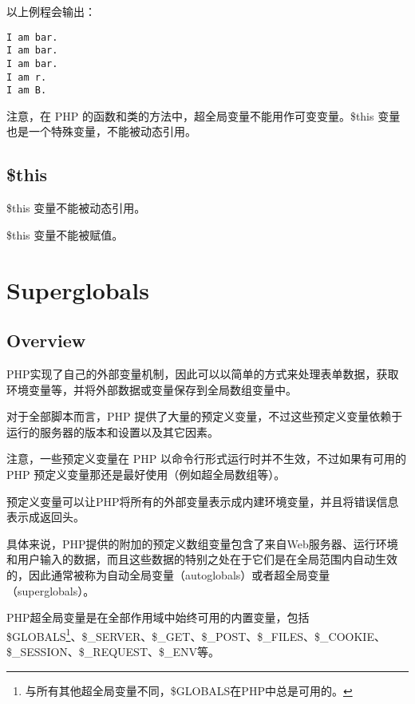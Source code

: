 以上例程会输出：

\begin{verbatim}
I am bar.
I am bar.
I am bar.
I am r.
I am B.
\end{verbatim}

注意，在 PHP 的函数和类的方法中，超全局变量不能用作可变变量。\$this 变量也是一个特殊变量，不能被动态引用。

\section{\$this}

\begin{compactitem}
\item \$this 变量不能被动态引用。
\item \$this 变量不能被赋值。
\end{compactitem}



\chapter{Superglobals}


\section{Overview}


PHP实现了自己的外部变量机制，因此可以以简单的方式来处理表单数据，获取环境变量等，并将外部数据或变量保存到全局数组变量中。




对于全部脚本而言，PHP 提供了大量的预定义变量，不过这些预定义变量依赖于运行的服务器的版本和设置以及其它因素。



注意，一些预定义变量在 PHP 以命令行形式运行时并不生效，不过如果有可用的 PHP 预定义变量那还是最好使用（例如超全局数组等）。

预定义变量可以让PHP将所有的外部变量表示成内建环境变量，并且将错误信息表示成返回头。





具体来说，PHP提供的附加的预定义数组变量包含了来自Web服务器、运行环境和用户输入的数据，而且这些数据的特别之处在于它们是在全局范围内自动生效的，因此通常被称为自动全局变量（autoglobals）或者超全局变量（superglobals）。



PHP超全局变量是在全部作用域中始终可用的内置变量，包括\$GLOBALS\footnote{与所有其他超全局变量不同，\$GLOBALS在PHP中总是可用的。}、\$\_SERVER、\$\_GET、\$\_POST、\$\_FILES、\$\_COOKIE、\$\_SESSION、\$\_REQUEST、\$\_ENV等。



